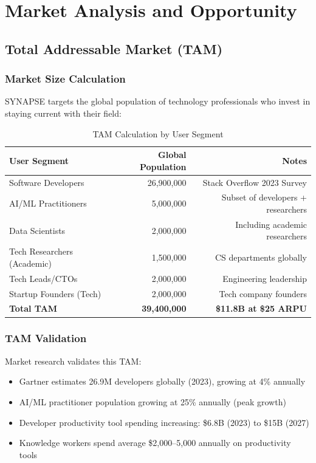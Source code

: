 \documentclass{report}
\begin{document}
\newpage

\chapter{Market Analysis and Opportunity}

\section{Total Addressable Market (TAM)}

\subsection{Market Size Calculation}

SYNAPSE targets the global population of technology professionals who invest in staying current with their field:

\begin{table}[h]
\centering
\begin{tabular}{|l|r|r|}
\toprule
\textbf{User Segment} & \textbf{Global Population} & \textbf{Notes} \\
\midrule
Software Developers & 26,900,000 & Stack Overflow 2023 Survey \\
AI/ML Practitioners & 5,000,000 & Subset of developers + researchers \\
Data Scientists & 2,000,000 & Including academic researchers \\
Tech Researchers (Academic) & 1,500,000 & CS departments globally \\
Tech Leads/CTOs & 2,000,000 & Engineering leadership \\
Startup Founders (Tech) & 2,000,000 & Tech company founders \\
\midrule
\textbf{Total TAM} & \textbf{39,400,000} & \textbf{~\$11.8B at \$25 ARPU} \\
\bottomrule
\end{tabular}
\caption{TAM Calculation by User Segment}
\end{table}

\subsection{TAM Validation}

Market research validates this TAM:

\begin{itemize}
    \item Gartner estimates 26.9M developers globally (2023), growing at 4\% annually
    \item AI/ML practitioner population growing at 25\% annually (peak growth)
    \item Developer productivity tool spending increasing: \$6.8B (2023) to \$15B (2027)
    \item Knowledge workers spend average \$2,000--5,000 annually on productivity tools
\end{itemize}
\end{document}
